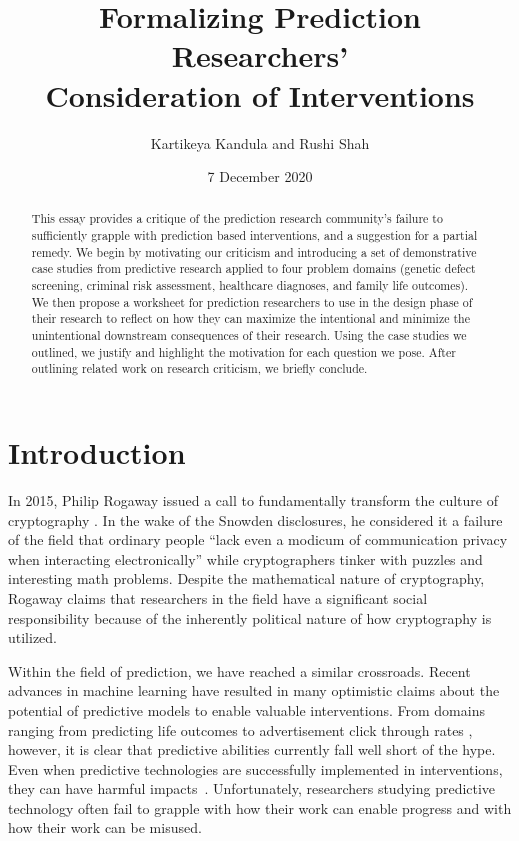 \documentclass[12pt]{article}
\title{Formalizing Prediction Researchers' \\ Consideration of Interventions}
\author{Kartikeya Kandula and Rushi Shah}
\date{7 December 2020}
\begin{document}
\maketitle

\begin{abstract}
    This essay provides a critique of the prediction research community's failure to sufficiently grapple with prediction based interventions, and a suggestion for a partial remedy. We begin by motivating our criticism and introducing a set of demonstrative case studies from predictive research applied to four problem domains (genetic defect screening, criminal risk assessment, healthcare diagnoses, and family life outcomes). We then propose a worksheet for prediction researchers to use in the design phase of their research to reflect on how they can maximize  the  intentional  and  minimize  the  unintentional  downstream  consequences  of their research. Using the case studies we outlined, we justify and highlight the motivation for each question we pose. After outlining related work on research criticism, we briefly conclude.   
\end{abstract}

\section{Introduction}
In 2015, Philip Rogaway issued a call to fundamentally transform the culture of cryptography \cite{crypto}. In the wake of the Snowden disclosures, he considered it a failure of the field that ordinary people ``lack even a modicum of communication privacy when interacting electronically'' while cryptographers tinker with puzzles and interesting math problems. Despite the mathematical nature of cryptography, Rogaway claims that researchers in the field have a significant social responsibility because of the inherently political nature of how cryptography is utilized.

Within the field of prediction, we have reached a similar crossroads. Recent advances in machine learning have resulted in many optimistic claims about the potential of predictive models to enable valuable interventions. From domains ranging from predicting life outcomes \cite{fragilefamilies} to advertisement click through rates \cite{ads}, however, it is clear that predictive abilities currently fall well short of the hype. Even when predictive technologies are successfully implemented in interventions, they can have harmful impacts~\cite{propublica}. Unfortunately, researchers studying predictive technology often fail to grapple with how their work can enable progress and with how their work can be misused.
\end{document}
